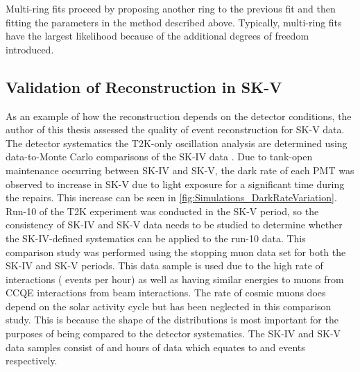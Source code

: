 Multi-ring fits proceed by proposing another ring to the previous fit and then fitting the parameters in the method described above. Typically, multi-ring fits have the largest likelihood because of the additional degrees of freedom introduced.  

\subsection{Validation of Reconstruction in SK-V}
\label{sec:Simulation_ReconstructionInSKV}

As an example of how the reconstruction depends on the detector conditions, the author of this thesis assessed the quality of event reconstruction for SK-V data. The detector systematics   the T2K-only oscillation analysis are determined using data-to-Monte Carlo comparisons of the SK-IV data \cite{t2k_tn_399}. Due to tank-open maintenance occurring between SK-IV and SK-V, the dark rate of each PMT was observed to increase in SK-V due to light exposure for a significant time during the repairs. This increase can be seen in \autoref{fig:Simulations_DarkRateVariation}. Run-10 of the T2K experiment was conducted in the SK-V period, so the consistency of SK-IV and SK-V data needs to be studied to determine whether the SK-IV-defined systematics can be applied to the run-10 data. This comparison study was performed using the stopping muon data set for both the SK-IV and SK-V periods. This data sample is used due to the high rate of interactions ( events per hour) as well as having similar energies to muons from CCQE \quickmath{\nu_{\mu}} interactions from beam interactions. The rate of cosmic muons does depend on the solar activity cycle \cite{Maghrabi2021} but has been neglected in this comparison study. This is because the shape of the distributions is most important for the purposes of being compared to the detector systematics. The SK-IV and SK-V data samples consist of  and  hours of data which equates to  and  events respectively.

